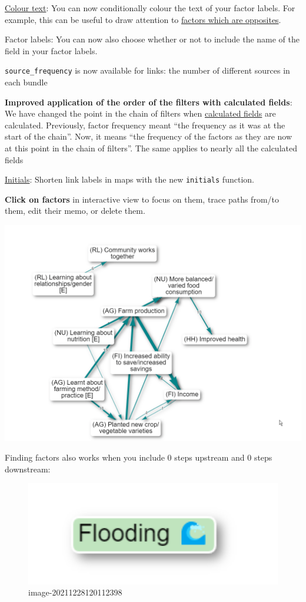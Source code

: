 \documentclass[
]{book}
\begin{document}
\protect\hyperlink{xcolour-text}{Colour text}: You can now conditionally colour the text of your factor labels. For example, this can be useful to draw attention to \href{https://causalmap.shinyapps.io/CM2test/?s=651}{factors which are opposites}.

Factor labels: You can now also choose whether or not to include the name of the field in your factor labels.

\texttt{source\_frequency} is now available for links: the number of different sources in each bundle

\textbf{Improved application of the order of the filters with calculated fields}: We have changed the point in the chain of filters when \protect\hyperlink{xcalculated-fields}{calculated fields} are calculated. Previously, factor frequency meant ``the frequency as it was at the start of the chain''. Now, it means ``the frequency of the factors as they are now at this point in the chain of filters''. The same applies to nearly all the calculated fields

\protect\hyperlink{xinitials}{Initials}: Shorten link labels in maps with the new \texttt{initials} function.

\textbf{Click on factors} in interactive view to focus on them, trace paths from/to them, edit their memo, or delete them.

\includegraphics{_assets/BhOlErDmwB.gif}

Finding factors also works when you include 0 steps upstream and 0 steps downstream:

\begin{figure}
\centering
\includegraphics[width=6.77083in,height=\textheight]{_assets/image-20211228120112398.png}
\caption{image-20211228120112398}
\end{figure}
\end{document}
